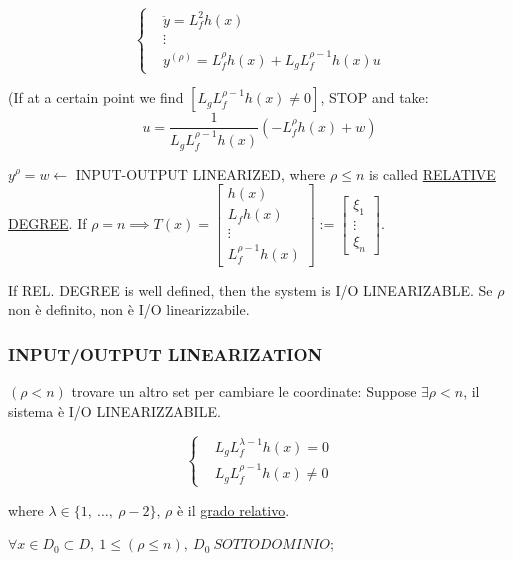 \[
	\left\{
	\begin{aligned}
	&\ddot{y}=L^2_fh(x) \\
	&\vdots \\
	&y^{(\rho)}=L^{\rho}_fh(x) + L_gL^{\rho-1}_fh(x)u
	\end{aligned}
	\right.
\]

(If at a certain point we find $[L_gL_f^{\rho -1}h(x) \neq 0]$, STOP and take:
\[
	u = \frac{1}{L_gL_f^{\rho-1}h(x)}(-L^{\rho}_fh(x) + w)
\]

$y^{\rho} = w \leftarrow$ INPUT-OUTPUT LINEARIZED, where $\rho \leq n$ is called \underline{RELATIVE DEGREE}. If $\rho =n \implies T(x) = \begin{bmatrix}h(x)\\L_fh(x)\\ \vdots \\ L^{\rho -1}_fh(x)\end{bmatrix} := \begin{bmatrix}\xi_1 \\ \vdots \\ \xi_n\end{bmatrix}$.

If REL. DEGREE is well defined, then the system is I/O LINEARIZABLE. Se $\rho$ non è definito, non è I/O linearizzabile.

\subsubsection{INPUT/OUTPUT LINEARIZATION}
$(\rho < n)$ trovare un altro set per cambiare le coordinate:
Suppose $\exists \rho < n$, il sistema è I/O LINEARIZZABILE.

\[
	\left\{
	\begin{aligned}
	&L_gL^{\lambda -1}_fh(x) = 0 \\
	&L_gL^{\rho -1}_fh(x) \neq 0
	\end{aligned}
	\right.
\]

where $\lambda \in \{1,\ \dots,\ \rho -2\}$, $\rho$ è il \underline{grado relativo}.

$\forall x \in D_0 \subset D,\ 1 \leq (\rho \leq n),\ D_0\ SOTTODOMINIO$;

